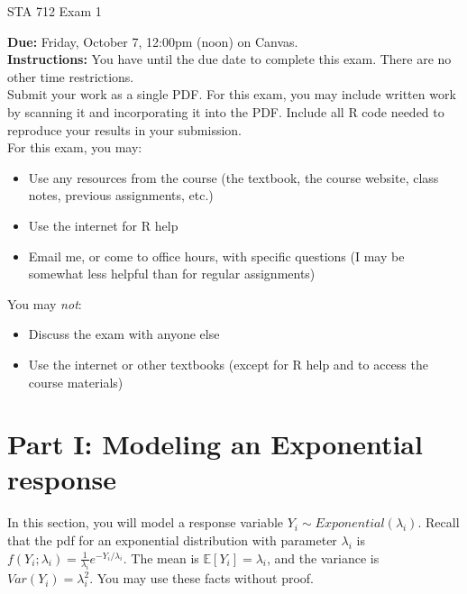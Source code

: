 \documentclass[11pt]{article}
\begin{document}
\begin{center}
\Large
STA 712 Exam 1\\
\normalsize
\vspace{5mm}
\end{center}

\noindent \textbf{Due:} Friday, October 7, 12:00pm (noon) on Canvas.\\ 

\noindent \textbf{Instructions:} You have until the due date to complete this exam. There are no other time restrictions.\\

\noindent Submit your work as a single PDF. For this exam, you may include written work by scanning it and incorporating it into the PDF. Include all R code needed to reproduce your results in your submission.\\

\noindent For this exam, you may:
\begin{itemize}
\item Use any resources from the course (the textbook, the course website, class notes, previous assignments, etc.)
\item Use the internet for R help
\item Email me, or come to office hours, with specific questions (I may be somewhat less helpful than for regular assignments)
\end{itemize}
You may \textit{not}:
\begin{itemize}
\item Discuss the exam with anyone else
\item Use the internet or other textbooks (except for R help and to access the course materials)
\end{itemize}

\newpage

\section*{Part I: Modeling an Exponential response}

In this section, you will model a response variable $Y_i \sim Exponential(\lambda_i)$. Recall that the pdf for an exponential distribution with parameter $\lambda_i$ is $f(Y_i;\lambda_i) = \frac{1}{\lambda_i} e^{-Y_i / \lambda_i}$. The mean is $\mathbb{E}[Y_i] = \lambda_i$, and the variance is $Var(Y_i) = \lambda_i^2$. You may use these facts without proof.
\end{document}
